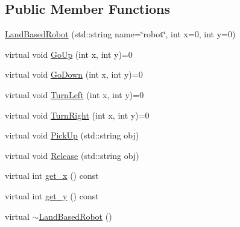 \subsection*{Public Member Functions}
\begin{DoxyCompactItemize}
\item 
\hyperlink{classrwa3_1_1_land_based_robot_abc40ff92063f51e3bf8ac8b7728ca12a}{Land\+Based\+Robot} (std\+::string name=\char`\"{}robot\char`\"{}, int x=0, int y=0)
\item 
virtual void \hyperlink{classrwa3_1_1_land_based_robot_a955b0741cce58648074edff80ac1ce29}{Go\+Up} (int x, int y)=0
\item 
virtual void \hyperlink{classrwa3_1_1_land_based_robot_a14fcb1b05297131cd09e8a57b8de0578}{Go\+Down} (int x, int y)=0
\item 
virtual void \hyperlink{classrwa3_1_1_land_based_robot_a9adfb103725320c1daff9ab72b0aad08}{Turn\+Left} (int x, int y)=0
\item 
virtual void \hyperlink{classrwa3_1_1_land_based_robot_ab62f4e787ae7f04dd9374b4f7e84985c}{Turn\+Right} (int x, int y)=0
\item 
virtual void \hyperlink{classrwa3_1_1_land_based_robot_adf0c76440e2f9d2ea5cbe7193cddfe2b}{Pick\+Up} (std\+::string obj)
\item 
virtual void \hyperlink{classrwa3_1_1_land_based_robot_a5cae9fc0c1365b984e09b807f79089e0}{Release} (std\+::string obj)
\item 
virtual int \hyperlink{classrwa3_1_1_land_based_robot_af47bec53268bd409305d2f97f45411ab}{get\+\_\+x} () const
\item 
virtual int \hyperlink{classrwa3_1_1_land_based_robot_a6de17dafe355573275264f74a59f974d}{get\+\_\+y} () const
\item 
virtual \hyperlink{classrwa3_1_1_land_based_robot_ac57e1fa6a06533403765c3ca0a7fc2d6}{$\sim$\+Land\+Based\+Robot} ()
\end{DoxyCompactItemize}
